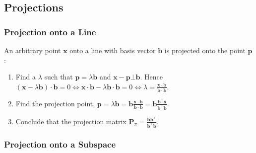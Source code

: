 \documentclass[10pt,twoside,twocolumn]{article}
\begin{document}
\subsection{Projections}


\subsubsection{Projection onto a Line}

An arbitrary point $\mathbf{x}$ onto a line with basis vector $\mathbf{b}$
is projected onto the point $\mathbf{p}$: 
\begin{enumerate}
\item Find a $\lambda$ such that $\mathbf{p}=\lambda\mathbf{b}$ and $\mathbf{x}-\mathbf{p}\bot\mathbf{b}$.
Hence $\left(\mathbf{x}-\lambda\mathbf{b}\right)\cdot\mathbf{b}=0\iff\mathbf{x}\cdot\mathbf{b}-\lambda\mathbf{b}\cdot\mathbf{b}=0\iff\boxed{\lambda=\frac{\mathbf{x}\cdot\mathbf{b}}{\mathbf{b}\cdot\mathbf{b}}}$. 
\item Find the projection point, $\boxed{\mathbf{p}=\lambda\mathbf{b}}=\mathbf{b}\frac{\mathbf{x}\cdot\mathbf{b}}{\mathbf{b}\cdot\mathbf{b}}=\mathbf{b}\frac{\mathbf{b}^{\top}\mathbf{x}}{\mathbf{b}^{\top}\mathbf{b}}$. 
\item Conclude that the projection matrix $\boxed{\mathbf{P}_{\pi}=\frac{\mathbf{b}\mathbf{b}^{\top}}{\mathbf{b}^{\top}\mathbf{b}}}$. 
\end{enumerate}

\subsubsection{Projection onto a Subspace}
\end{document}
